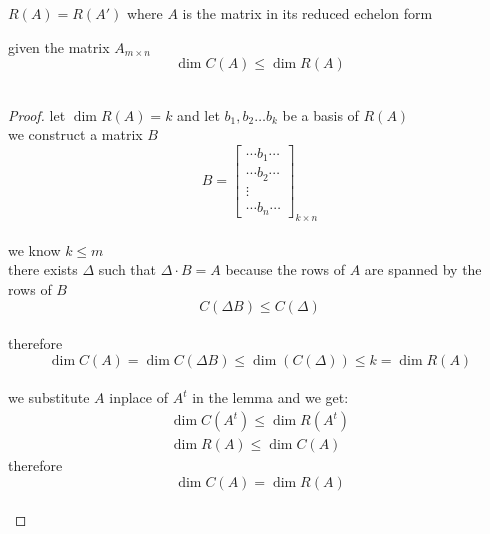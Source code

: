 \documentclass[a4paper,12pt]{article}
\begin{document}
\begin{definition}
\begin{lemma}
\begin{entailment}
\(R(A) = R(A')\) where \(A\) is the matrix in its reduced echelon form\\
\end{entailment}
\end{lemma}

\begin{lemma}
given the matrix \(A_{m \times n}\)\\
\[
  \dim C(A) \leq \dim R(A)
\]\\
\begin{proof}
let \(\dim R(A) = k\) and let \(b_1,b_2\ldots b_k\) be a basis of \(R(A)\)\\
we construct a matrix \(B\)\\
\[
  B = \begin{bmatrix} \cdots b_1 \cdots\\ \cdots b_2 \cdots\\ \vdots\\ \cdots b_n \cdots \end{bmatrix}_{k \times n}
\]\\
we know \(k \leq m\)\\
there exists \(\Delta\) such that \(\Delta \cdot B = A\) because the rows of \(A\) are spanned by the rows of \(B\)\\
\[
  C(\Delta B) \leq C(\Delta)
\]\\
therefore\\
\[
  \dim C(A) = \dim C(\Delta B) \leq \dim(C(\Delta)) \leq k = \dim R(A)
\]\\
we substitute \(A\) inplace of \(A^t\) in the lemma and we get:\\
\begin{align*}
  \dim C(A^t) \leq \dim R(A^t)\\
  \dim R(A) \leq \dim C(A)
\end{align*}
therefore\\
\[
  \dim C(A) = \dim R(A)
\]\\
\end{proof}
\end{lemma}
\end{definition}
\end{document}
